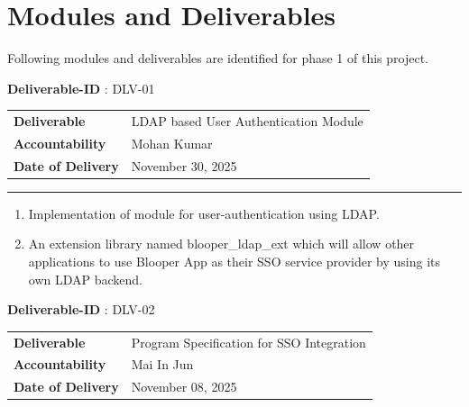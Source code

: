 \documentclass{article}%
\makeatletter
\renewcommand{\arraystretch}{1.5}%
\newcommand{\tinytosmall}{%
  \fontsize
    {\fpeval{(\f@size@tiny+\f@size@small)/2}}
    {\fpeval{(\f@baselineskip@tiny+\f@baselineskip@small)/2}}%
  \selectfont
}
\makeatother
\begin{document}
\section{Modules and Deliverables}%

%
Following modules and deliverables are identified for phase 1 of this project.%
\hypertarget{ID:610896001}{}%
\begin{fancybox2}{\small \faChevronCircleRight \normalsize \xspace %
\tinytosmall%
\textbf{Deliverable{-}ID}%
: %
\xspace%
DLV{-}01%
\normalsize%
}%

\begin{tabularx}{\textwidth}{l X}
\rowcolor{lightapricot!50}%
\tinytosmall{\textbf{Deliverable}} & %
\tinytosmall{LDAP based User Authentication Module}%
\\%

\rowcolor{lightapricot!30} \tinytosmall{\textbf{Accountability}} & \tinytosmall{Mohan Kumar} \\
\rowcolor{lightapricot!10} \tinytosmall{\textbf{Date of Delivery}} & \tinytosmall{November 30, 2025} \\
\end{tabularx}%
\par%
\small%
\vspace{0.25\baselineskip}%
\rule{\textwidth}{0.4pt}%
\newline%
\vspace{0.25\baselineskip}%
\small%
\begin{enumerate}[leftmargin=*, label=\arabic*.]%
\item %
Implementation of module for user{-}authentication using LDAP.%
\item %
An extension library named blooper\_ldap\_ext which will allow other applications to use Blooper App as their SSO service provider by using its own LDAP backend.%
\end{enumerate}%
\normalsize%
\normalsize%
\end{fancybox2}%
\hypertarget{ID:202908660}{}%
\begin{fancybox2}{\small \faChevronCircleRight \normalsize \xspace %
\tinytosmall%
\textbf{Deliverable{-}ID}%
: %
\xspace%
DLV{-}02%
\normalsize%
}%

\begin{tabularx}{\textwidth}{l X}
\rowcolor{lightapricot!50}%
\tinytosmall{\textbf{Deliverable}} & %
\tinytosmall{Program Specification for SSO Integration}%
\\%

\rowcolor{lightapricot!30} \tinytosmall{\textbf{Accountability}} & \tinytosmall{Mai In Jun} \\
\rowcolor{lightapricot!10} \tinytosmall{\textbf{Date of Delivery}} & \tinytosmall{November 08, 2025} \\
\end{tabularx}%
\par%
\small%
\normalsize%
\end{fancybox2}%
\end{document}
